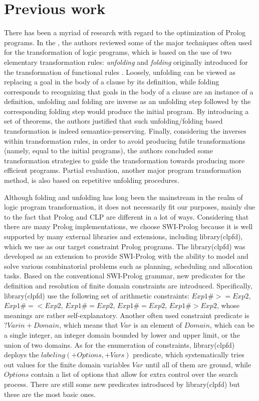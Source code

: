 \documentclass[12pt]{article}
\begin{document}
\section{Previous work}\label{previous work}
There has been a myriad of research with regard to the optimization of Prolog programs. In the \cite{pettorossi1994transformation}, the authors reviewed some of the major techniques often used for the transformation of logic programs, which is based on the use of two elementary transformation rules: \emph{unfolding} and \emph{folding} originally introduced for the transformation of functional rules \cite{burstall1977transformation}. Loosely, unfolding can be viewed as replacing a goal in the body of a clause by its definition, while folding corresponds to recognizing that goals in the body of a clause are an instance of a definition, unfolding and folding are inverse as an unfolding step followed by the corresponding folding step would produce the initial program. By introducing a set of theorems, the authors justified that such unfolding/folding based transformation is indeed semantics-preserving. Finally, considering the inverses within transformation rules, in order to avoid producing futile transformations (namely, equal to the initial programs), the authors concluded some transformation strategies to guide the transformation towards producing more efficient programs. Partial evaluation, another major program transformation method, is also based on repetitive unfolding procedures.

Although folding and unfolding has long been the mainstream in the realm of logic program transformation, it does not necessarily fit our purposes, mainly due to the fact that Prolog and CLP are different in a lot of ways. Considering that there are many Prolog implementations, we choose SWI-Prolog because it is well supported by many external libraries and extensions, including library(clpfd), which we use as our target constraint Prolog programs. The library(clpfd) was developed as an extension to provide SWI-Prolog with the ability to model and solve various combinatorial problems such as planning, scheduling and allocation tasks. Based on the conventional SWI-Prolog grammar, new predicates for the definition and resolution of finite domain constraints are introduced. Specifically, library(clpfd) use the following set of arithmetic constraints: $Exp1\#>=Exp2$, $Exp1\#=<Exp2$, $Exp1\#=Exp2$, $Exp1\#=Exp2$, $Exp1\#>Exp2$, whose meanings are rather self-explanatory. Another often used constraint predicate is $?Var in +Domain$, which means that $Var$ is an element of $Domain$, which can be a single integer, an integer domain bounded by lower and upper limit, or the union of two domains. As for the enumeration of constraints, library(clpfd) deploys the $labeling(+Options, +Vars)$ predicate, which systematically tries out values for the finite domain variables $Var$ until all of them are ground, while $Options$ contain a list of options that allow for extra control over the search process. There are still some new predicates introduced by library(clpfd) but these are the most basic ones.
\end{document}
